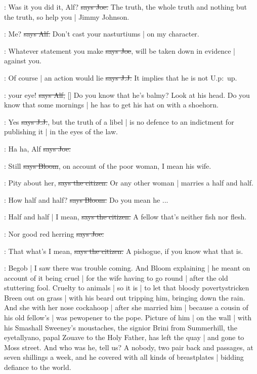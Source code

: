 \joe:
Was it you did it,
Alf?
\sout{says Joe.}
The truth,
the whole truth and nothing but the truth,
so help you |
Jimmy Johnson.

\bergan:
Me?
\sout{says Alf.}
Don't cast your nasturtiums |
on my character.

\joe:
Whatever statement you make
\sout{says Joe},
will be taken down in evidence |
against you.

\jjom:
Of course |
an action would lie
\sout{says J.J.}
It implies that he is not 
U.p:~up.

\bergan:
 your eye!
\sout{says Alf,}
[]
Do you know that he's balmy?
Look at his head.
Do you know that some mornings |
he has to get his hat on with a shoehorn.

\jjom:
Yes
\sout{says J.J.},
but the truth of a libel |
is no defence to an indictment for publishing it |
in the eyes of the law.

\joe:
Ha ha,
Alf
\sout{says Joe.}

\Bloom:
Still
\sout{says Bloom},
on account of the poor woman,
I mean his wife.

\citizen:
Pity about her,
\sout{says the citizen.}
Or any other woman |
marries a half and half.

\Bloom:
How half and half?
\sout{says Bloom.}
Do you mean he ...

\citizen:
Half and half |
I mean,
\sout{says the citizen.}
A fellow that's neither fish nor flesh.

\joe:
Nor good red herring
\sout{says Joe.}

\citizen:
That what's I mean,
\sout{says the citizen.}
A pishogue,
if you know what that is.

\Nq:
Begob |
I saw there was trouble coming.
And Bloom explaining |
he meant on account of it being cruel |
for the wife having to go round |
after the old stuttering fool.
Cruelty to animals |
so it is |
to let that bloody povertystricken Breen out on grass |
with his beard out tripping him,
bringing down the rain.
And she with her nose cockahoop |
after she married him |
because a cousin of his old fellow's |
was pewopener to the pope.
Picture of him |
on the wall |
with his Smashall Sweeney's moustaches,
the signior Brini from Summerhill,
the eyetallyano,
papal Zouave to the Holy Father,
has left the quay |
and gone to Moss street.
And who was he,
tell us?
A nobody,
two pair back and passages,
at seven shillings a week,
and he covered with all kinds of breastplates |
bidding defiance to the world.

